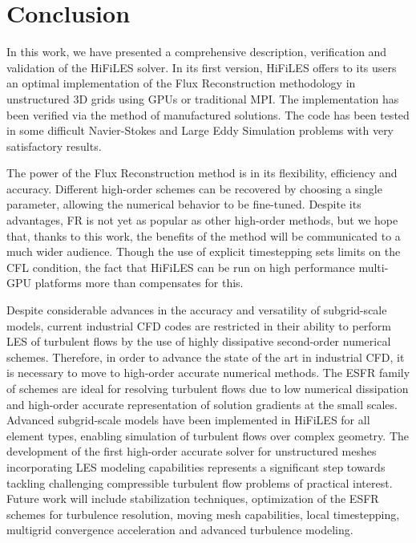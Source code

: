 
\section{Conclusion}
\label{sec:conclusion}

In this work, we have presented a comprehensive description, verification and validation of the HiFiLES solver. In its first version, HiFiLES offers to its users an optimal implementation of the Flux Reconstruction methodology in unstructured 3D grids using GPUs or traditional MPI. The implementation has been verified via the method of manufactured solutions. The code has been tested in some difficult Navier-Stokes and Large Eddy Simulation problems with very satisfactory results.

The power of the Flux Reconstruction method is in its flexibility, efficiency and accuracy.
Different high-order schemes can be recovered by choosing a single parameter, allowing the numerical behavior to be fine-tuned.
Despite its advantages, FR is not yet as popular as other high-order methods, but we hope that, thanks to this work, the benefits of the method will be communicated to a much wider audience.
Though the use of explicit timestepping sets limits on the CFL condition, the fact that HiFiLES can be run on high performance multi-GPU platforms more than compensates for this.


Despite considerable advances in the accuracy and versatility of subgrid-scale models, current industrial CFD codes are restricted in their ability to perform LES of turbulent flows by the use of highly dissipative second-order numerical schemes.
Therefore, in order to advance the state of the art in industrial CFD, it is necessary to move to high-order accurate numerical methods.
The ESFR family of schemes are ideal for resolving turbulent flows due to low numerical dissipation and high-order accurate representation of solution gradients at the small scales.
Advanced subgrid-scale models have been implemented in HiFiLES for all element types, enabling simulation of turbulent flows over complex geometry.
The development of the first high-order accurate solver for unstructured meshes incorporating LES modeling capabilities represents a significant step towards tackling challenging compressible turbulent flow problems of practical interest.
Future work will include stabilization techniques, optimization of the ESFR schemes for turbulence resolution, moving mesh capabilities, local timestepping, multigrid convergence acceleration and advanced turbulence modeling.